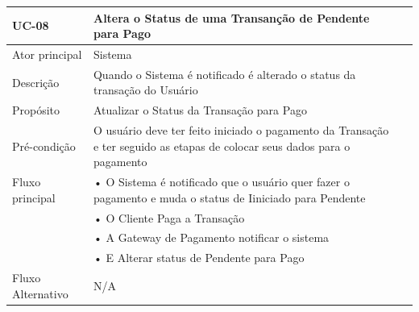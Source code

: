 \documentclass[a4paper,12pt]{article}
\begin{document}
\begin{table}[ht]
    \centering
    \begin{tabular}{|p{3.5cm}|p{10cm}|p{7cm}|}
        \hline
        \textbf{UC-08}                     & \textbf{ Altera o Status de uma Transanção de Pendente para Pago}                                                           \\
        \hline

        \multirow{1}{*}{Ator principal}    & Sistema                                                                                                                     \\
        \hline
        \multirow{1}{*}{Descrição}         & Quando o Sistema é notificado é alterado o status da transação do Usuário                                                   \\
        \hline

        \multirow{1}{*}{Propósito}         & Atualizar o Status da Transação para Pago                                                                                   \\
        \hline

        \multirow{1}{*}{Pré-condição}      & O usuário deve ter feito iniciado o pagamento da Transação e ter seguido as etapas de colocar seus dados para o pagamento   \\
        \hline

        \multirow{1}{*}{Fluxo principal}   & • O Sistema é notificado que o usuário quer fazer o pagamento e muda o status de Iiniciado para Pendente                    \\
                                           & • O Cliente Paga a Transação                                                                                                \\
                                           & • A Gateway de Pagamento notificar o sistema                                                                                \\
                                           & • E Alterar status de Pendente para Pago                                                                                    \\
        \hline

        \multirow{1}{*}{Fluxo Alternativo} & N/A                                                                                                                         \\
        \hline


\end{tabular}
\end{table}
\end{document}
